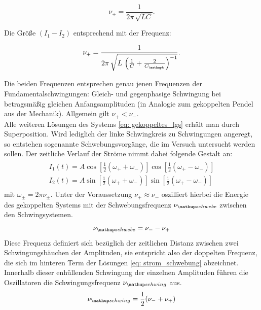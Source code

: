 \begin{equation}
  \nu_+ = \frac{1}{2\pi \, \sqrt{LC}}.
  \label{eq: nu+}
\end{equation}

Die Größe $\left( I_1 - I_2 \right)$ entsprechend mit der Frequenz:

\begin{equation}
\nu_+ = \frac{1}{2\pi \, \sqrt{L\, \left(\frac{1}{C} + \frac{2}{C\ua{k}}\right)^{-1}}}.
\label{eq: nu-}
\end{equation}

Die beiden Frequenzen entsprechen genau jenen Frequenzen der Fundamentalschwingungen: Gleich- und gegenphasige Schwingung bei
betragsmäßig gleichen Anfangsamplituden (in Analogie zum gekoppelten Pendel aus der Mechanik). Allgemein gilt $\nu_+ < \nu_-$.\\
Alle weiteren Lösungen des Systems \eqref{eq: gekoppeltes_lgs} erhält man durch Superposition. Wird lediglich der linke Schwingkreis zu Schwingungen
angeregt, so entstehen sogenannte Schwebungsvorgänge, die im Versuch untersucht werden sollen. Der zeitliche Verlauf der Ströme nimmt dabei folgende
Gestalt an:
  \begin{align}
  \begin{aligned}
    I_1(t) = A \cos\left[\frac{1}{2}(\omega_+ + \omega_-) \right]\cos\left[\frac{1}{2}(\omega_+ - \omega_-) \right] \\
    I_2(t) = A \sin\left[\frac{1}{2}(\omega_+ + \omega_-) \right]\sin\left[\frac{1}{2}(\omega_+ - \omega_-) \right]
    \label{eq: strom_schwebung}
  \end{aligned}
  \end{align}
mit $\omega_{\pm} = 2\pi \nu_{\pm}$. Unter der Voraussetzung $\nu_+ \approx \nu_-$ oszilliert hierbei die Energie des gekoppelten Systems
mit der Schwebungsfrequenz $\nu\ua{schwebe}$ zwischen den Schwingsystemen.
\begin{equation}
  \nu\ua{schwebe} = \nu_- - \nu_+
  \label{eq: nu_schwebe}
\end{equation}
Diese Frequenz definiert sich bezüglich der zeitlichen Distanz zwischen zwei Schwingungsbäuchen der Amplituden, sie entspricht also
der doppelten Frequenz, die sich im hinteren Term der Lösungen \eqref{eq: strom_schwebung} abzeichnet.
Innerhalb dieser enhüllenden Schwingung der einzelnen Amplituden führen die Oszillatoren die Schwingungsfrequenz $\nu\ua{schwing}$ aus.
\begin{equation}
  \nu\ua{schwing} =  \frac{1}{2}(\nu_- + \nu_+)
  \label{eq: nu_schwing}
\end{equation}\par
